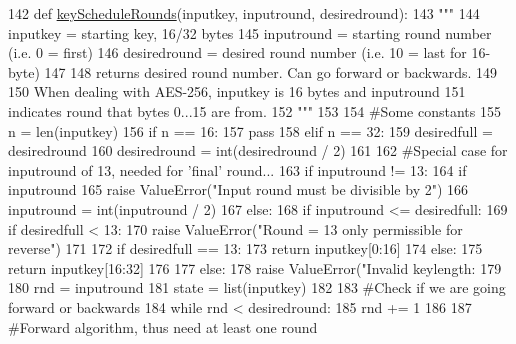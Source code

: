 \begin{DoxyCode}
142 \textcolor{keyword}{def }\hyperlink{namespacesoftware_1_1chipwhisperer_1_1analyzer_1_1models_1_1aes_1_1key__schedule_aa0e0cef2bfba47599cd9fdaed40e4c5c}{keyScheduleRounds}(inputkey, inputround, desiredround):
143     \textcolor{stringliteral}{"""}
144 \textcolor{stringliteral}{    inputkey = starting key, 16/32 bytes}
145 \textcolor{stringliteral}{    inputround = starting round number (i.e. 0 = first)}
146 \textcolor{stringliteral}{    desiredround = desired round number (i.e. 10 = last for 16-byte)}
147 \textcolor{stringliteral}{}
148 \textcolor{stringliteral}{    returns desired round number. Can go forward or backwards.}
149 \textcolor{stringliteral}{}
150 \textcolor{stringliteral}{    When dealing with AES-256, inputkey is 16 bytes and inputround}
151 \textcolor{stringliteral}{    indicates round that bytes 0...15 are from.}
152 \textcolor{stringliteral}{    """}
153 
154     \textcolor{comment}{#Some constants}
155     n = len(inputkey)
156     \textcolor{keywordflow}{if} n == 16:
157         \textcolor{keywordflow}{pass}
158     \textcolor{keywordflow}{elif} n == 32:
159         desiredfull = desiredround
160         desiredround = int(desiredround / 2)
161 
162         \textcolor{comment}{#Special case for inputround of 13, needed for 'final' round...}
163         \textcolor{keywordflow}{if} inputround != 13:
164             \textcolor{keywordflow}{if} inputround %
165                 \textcolor{keywordflow}{raise} ValueError(\textcolor{stringliteral}{"Input round must be divisible by 2"})
166             inputround = int(inputround / 2)
167         \textcolor{keywordflow}{else}:
168             \textcolor{keywordflow}{if} inputround <= desiredfull:
169                 \textcolor{keywordflow}{if} desiredfull < 13:
170                     \textcolor{keywordflow}{raise} ValueError(\textcolor{stringliteral}{"Round = 13 only permissible for reverse"})
171 
172                 \textcolor{keywordflow}{if} desiredfull == 13:
173                     \textcolor{keywordflow}{return} inputkey[0:16]
174                 \textcolor{keywordflow}{else}:
175                     \textcolor{keywordflow}{return} inputkey[16:32]
176 
177     \textcolor{keywordflow}{else}:
178         \textcolor{keywordflow}{raise} ValueError(\textcolor{stringliteral}{"Invalid keylength: %
179 
180     rnd = inputround
181     state = list(inputkey)
182 
183     \textcolor{comment}{#Check if we are going forward or backwards}
184     \textcolor{keywordflow}{while} rnd < desiredround:
185         rnd += 1
186 
187         \textcolor{comment}{#Forward algorithm, thus need at least one round}
}
\end{DoxyCode}
